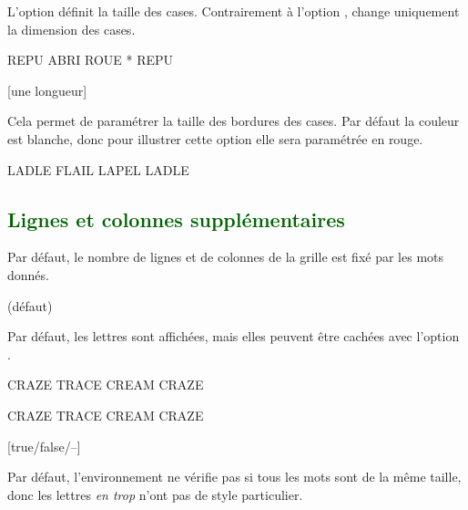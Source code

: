 \documentclass[svgnames]{report}
\newcommand\Section[1]{\subsection{\textcolor{DarkGreen}{#1}}}
\begin{document}
  L'option  définit la taille des cases. Contrairement à l'option ,  change uniquement la dimension des cases.

  \begin{example}
  \begin{GrilleSutom}[Taille=10mm,Police=\huge\bfseries]{REPU}
     ABRI ROUE * REPU
  \end{GrilleSutom}
  \end{example}

  [une longueur]

  Cela permet de paramétrer la taille des bordures des cases. Par défaut la couleur est blanche, donc pour illustrer cette option elle sera paramétrée en rouge.

  \begin{example}
  \begin{GrilleSutom}[Epaisseur=0.75mm,
                      CouleurBordures=red]{LADLE}
     FLAIL
     LAPEL
     LADLE
  \end{GrilleSutom}
  \end{example}

  \Section{Lignes et colonnes supplémentaires}

  Par défaut, le nombre de lignes et de colonnes de la grille est fixé par les mots donnés.

   (défaut)\qquad

  Par défaut, les lettres sont affichées, mais elles peuvent être cachées avec l'option .

  \begin{example}
  \begin{GrilleSutom}{CRAZE} %
    TRACE
    CREAM
    CRAZE
  \end{GrilleSutom}
  \end{example}

  \begin{example}
  \begin{GrilleSutom}[NonLettres]{CRAZE}
    TRACE
    CREAM
    CRAZE
  \end{GrilleSutom}
  \end{example}

  [true/false/--]

  Par défaut, l'environnement ne vérifie pas si tous les mots sont de la même taille, donc les lettres \textit{en trop} n'ont pas de style particulier.
\end{document}
